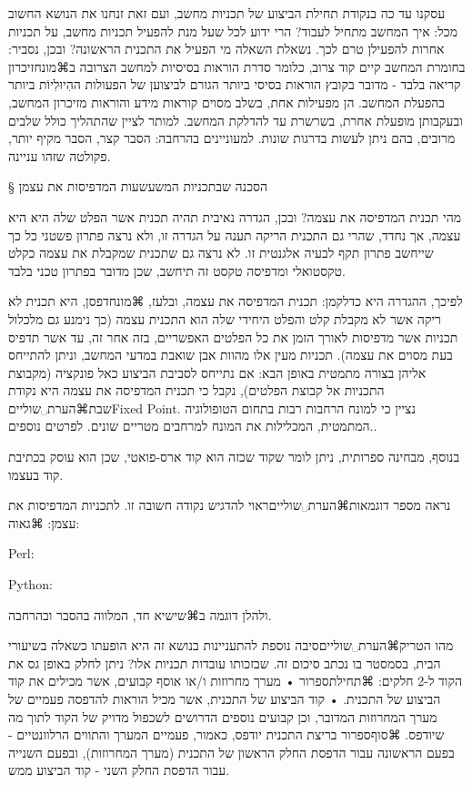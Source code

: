 עסקנו עד כה בנקודת תחילת הביצוע של תכניות מחשב, ועם זאת זנחנו את הנושא החשוב מכל: איך המחשב מתחיל לעבוד? הרי ידוע לכל שעל מנת להפעיל תכניות מחשב, על תכניות אחרות להפעילן טרם לכך. נשאלת השאלה מי הפעיל את התכנית הראשונה? ובכן, נסביר: בחומרת המחשב קיים קוד צרוב, כלומר סדרת הוראות בסיסיות למחשב הצרובה ב⌘מונח{זיכרון קריאה בלבד} - מדובר בקובץ הוראות בסיסי ביותר הגורם לביצוען של הפעולות ההִיוּלִיוֹת ביותר בהפעלת המחשב. הן מפעילות אחת, בשלב מסוים קוראות מידע והוראות מזיכרון המחשב, ובעקבותן מופעלת אחרת, בשרשרת עד להדלקת המחשב. למותר לציין שהתהליך כולל שלבים מרובים, בהם ניתן לעשות בדרגות שונות. למעוניינים בהרחבה: הסבר קצר, הסבר מקיף יותר, פקולטה שזהו עניינה.




§ הסכנה שבתכניות המשעשעות המדפיסות את עצמן

מהי תכנית המדפיסה את עצמה? ובכן, הגדרה נאיבית תהיה תכנית אשר הפלט שלה היא היא עצמה, אך נחדד, שהרי גם התכנית הריקה תענה על הגדרה זו, ולא נרצה פתרון פשטני כל כך שייחשב פתרון תקף לבעיה אלגנטית זו. לא נרצה גם שתכנית שמקבלת את עצמה כקלט טקסטואלי ומדפיסה טקסט זה תיחשב, שכן מדובר בפתרון טכני בלבד. 

לפיכך, ההגדרה היא כדלקמן: תכנית המדפיסה את עצמה, ובלעז, ⌘מונח{דפסן}, היא תכנית לא ריקה אשר לא מקבלת קלט והפלט היחידי שלה הוא התכנית עצמה (כך נימנע גם מלכלול תכניות אשר מדפיסות לאורך הזמן את כל הפלטים האפשריים, בזה אחר זה, עד אשר תדפיס בעת מסוים את עצמה). תכניות מעין אלו מהוות אבן שואבת במדעי המחשב, וניתן להתייחס אליהן בצורה מתמטית באופן הבא: אם נתייחס לסביבת הביצוע כאל פונקציה (מקבוצת התכניות אל קבוצת הפלטים), נקבל כי תכנית המדפיסה את עצמה היא נקודת שבת⌘הערת␣שוליים{Fixed Point. נציין כי למונח הרחבות רבות בתחום הטופולוגיה המתמטית, המכלילות את המונח למרחבים מטריים שונים. לפרטים נוספים.}. 

בנוסף, מבחינה ספרותית, ניתן לומר שקוד שכזה הוא קוד ארס-פואטי, שכן הוא עוסק בכתיבת קוד בעצמו. 

נראה מספר דוגמאות⌘הערת␣שוליים{ראוי להדגיש נקודה חשובה זו.} לתכניות המדפיסות את עצמן:
⌘גאוה:


Perl:



Python:

ולהלן דוגמה ב⌘שי{שיא חד}, המלווה בהסבר ובהרחבה.



מהו הטריק⌘הערת␣שוליים{סיבה נוספת להתעניינות בנושא זה היא הופעתו כשאלה בשיעורי הבית, בסמסטר בו נכתב סיכום זה.} שבזכותו עובדות תכניות אלו? ניתן לחלק באופן גס את הקוד ל-2 חלקים: 
⌘תחילת{ספרור}
• מערך מחרוזות ו/או אוסף קבועים, אשר מכילים את קוד הביצוע של התכנית.
• קוד הביצוע של התכנית, אשר מכיל הוראות להדפסה פעמיים של מערך המחרוזות המדובר, וכן קבועים נוספים הדרושים לשכפול מדויק של הקוד לתוך מה שיודפס. 
⌘סוף{ספרור}
בריצת התכנית יודפס, כאמור, פעמיים המערך והתווים הרלוונטיים - בפעם הראשונה עבור הדפסת החלק הראשון של התכנית (מערך המחרוזות), ובפעם השנייה עבור הדפסת החלק השני - קוד הביצוע ממש. 

